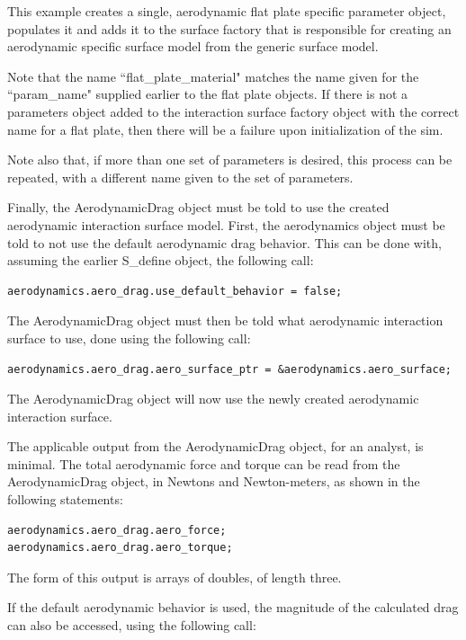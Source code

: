 This example creates a single, aerodynamic flat plate specific parameter
object, populates it and adds it to the surface factory that is responsible for
creating an aerodynamic specific surface model from the generic surface model.

Note that the name ``flat\_plate\_material" matches the name given for the
``param\_name" supplied earlier to the flat plate objects. If there is not
a parameters object added to the interaction surface factory object with the
correct name for a flat plate, then there will be a failure upon initialization
of the sim.

Note also that, if more than one set of parameters is desired, this process
can be repeated, with a different name given to the set of parameters.

Finally, the AerodynamicDrag object must be told to use the created
aerodynamic interaction surface model. First, the aerodynamics object
must be told to not use the default aerodynamic drag behavior. This can
be done with, assuming the earlier S\_define object, the following
call:

\begin{verbatim}
aerodynamics.aero_drag.use_default_behavior = false;
\end{verbatim}

The AerodynamicDrag object must then be told what aerodynamic
interaction surface to use, done using the following call:

\begin{verbatim}
aerodynamics.aero_drag.aero_surface_ptr = &aerodynamics.aero_surface;
\end{verbatim}

The AerodynamicDrag object will now use the newly created
aerodynamic interaction surface.

The applicable output from the AerodynamicDrag object, for an
analyst, is minimal. The total aerodynamic force and torque
can be read from the AerodynamicDrag object, in Newtons and
Newton-meters, as shown in the following statements:

\begin{verbatim}
aerodynamics.aero_drag.aero_force;
aerodynamics.aero_drag.aero_torque;
\end{verbatim}

The form of this output is arrays of doubles, of length three.

If the default aerodynamic behavior is used, the magnitude of the
calculated drag can also be accessed, using the following call:

